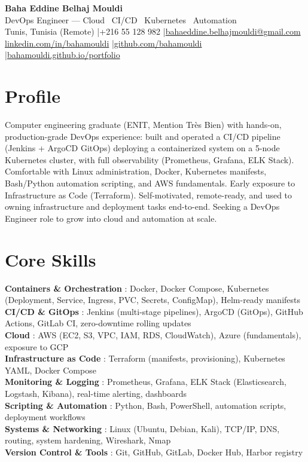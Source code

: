 \documentclass[a4paper,10pt]{article}
\begin{document}
\begin{center}
{\LARGE\bfseries\color{navy} Baha Eddine Belhaj Mouldi}\\[3pt]
{\large DevOps Engineer --- Cloud \textbar\ CI/CD \textbar\ Kubernetes \textbar\ Automation}\\[4pt]
Tunis, Tunisia (Remote) \quad|\quad +216 55 128 982 \quad|\quad \href{mailto:bahaeddine.belhajmouldi@gmail.com}{bahaeddine.belhajmouldi@gmail.com}\\[1pt]
\href{https://www.linkedin.com/in/bahamouldi}{linkedin.com/in/bahamouldi} \quad|\quad \href{https://github.com/bahamouldi}{github.com/bahamouldi} \quad|\quad \href{https://bahamouldi.github.io/portfolio/}{bahamouldi.github.io/portfolio}
\end{center}
\vspace{2pt}
\section{Profile}
Computer engineering graduate (ENIT, Mention Très Bien) with hands-on, production-grade DevOps experience: built and operated a CI/CD pipeline (Jenkins + ArgoCD GitOps) deploying a containerized system on a 5-node Kubernetes cluster, with full observability (Prometheus, Grafana, ELK Stack). Comfortable with Linux administration, Docker, Kubernetes manifests, Bash/Python automation scripting, and AWS fundamentals. Early exposure to Infrastructure as Code (Terraform). Self-motivated, remote-ready, and used to owning infrastructure and deployment tasks end-to-end. Seeking a DevOps Engineer role to grow into cloud and automation at scale.
\section{Core Skills}
\textbf{Containers \& Orchestration} : Docker, Docker Compose, Kubernetes (Deployment, Service, Ingress, PVC, Secrets, ConfigMap), Helm-ready manifests\\[0.5pt]
\textbf{CI/CD \& GitOps} : Jenkins (multi-stage pipelines), ArgoCD (GitOps), GitHub Actions, GitLab CI, zero-downtime rolling updates\\[0.5pt]
\textbf{Cloud} : AWS (EC2, S3, VPC, IAM, RDS, CloudWatch), Azure (fundamentals), exposure to GCP\\[0.5pt]
\textbf{Infrastructure as Code} : Terraform (manifests, provisioning), Kubernetes YAML, Docker Compose\\[0.5pt]
\textbf{Monitoring \& Logging} : Prometheus, Grafana, ELK Stack (Elasticsearch, Logstash, Kibana), real-time alerting, dashboards\\[0.5pt]
\textbf{Scripting \& Automation} : Python, Bash, PowerShell, automation scripts, deployment workflows\\[0.5pt]
\textbf{Systems \& Networking} : Linux (Ubuntu, Debian, Kali), TCP/IP, DNS, routing, system hardening, Wireshark, Nmap\\[0.5pt]
\textbf{Version Control \& Tools} : Git, GitHub, GitLab, Docker Hub, Harbor registry
\end{document}
